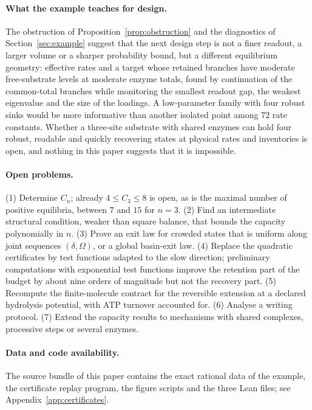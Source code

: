 \paragraph{What the example teaches for design.}
The obstruction of Proposition~\ref{prop:obstruction} and the diagnostics of
Section~\ref{sec:example} suggest that the next design step is not a finer readout, a larger
volume or a sharper probability bound, but a different equilibrium geometry: effective rates
and a target whose retained branches have moderate free-substrate levels at moderate enzyme
totals, found by continuation of the common-total branches while monitoring the smallest
readout gap, the weakest eigenvalue and the size of the loadings. A low-parameter family with
four robust sinks would be more informative than another isolated point among \(72\) rate
constants. Whether a three-site substrate with shared enzymes can hold four robust, readable
and quickly recovering states at physical rates and inventories is open, and nothing in this
paper suggests that it is impossible.

\paragraph{Open problems.}
(1) Determine \(C_n\); already \(4\le C_3\le8\) is open, as is the maximal number of positive
equilibria, between \(7\) and \(15\) for \(n=3\). (2) Find an intermediate structural condition,
weaker than square balance, that bounds the capacity polynomially in \(n\). (3) Prove an exit
law for crowded states that is uniform along joint sequences \((\delta,\Omega)\), or a global
basin-exit law. (4) Replace the quadratic certificates by test functions adapted to the slow
direction; preliminary computations with exponential test functions improve the retention
part of the budget by about nine orders of magnitude but not the recovery part. (5) Recompute
the finite-molecule contract for the reversible extension at a declared hydrolysis potential,
with ATP turnover accounted for. (6) Analyse a writing protocol. (7) Extend the capacity
results to mechanisms with shared complexes, processive steps or several enzymes.

\paragraph{Data and code availability.}
The source bundle of this paper contains the exact rational data of the example, the
certificate replay program, the figure scripts and the three Lean files; see
Appendix~\ref{app:certificates}.
